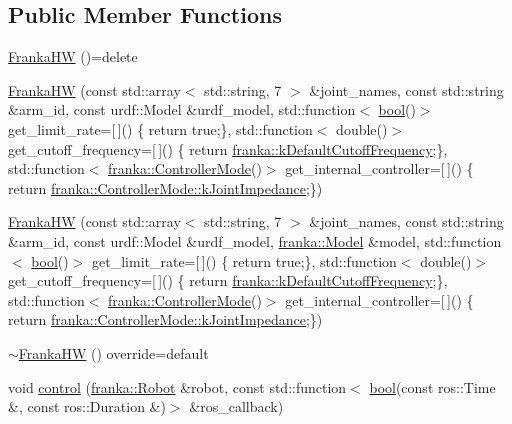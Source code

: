 \subsection*{Public Member Functions}
\begin{DoxyCompactItemize}
\item 
\hyperlink{classfranka__hw_1_1FrankaHW_a07f709fd8367ebf376214e4decf8cf57}{Franka\+HW} ()=delete
\item 
\hyperlink{classfranka__hw_1_1FrankaHW_aa8af6654cc9b7562545a59c035e245b9}{Franka\+HW} (const std\+::array$<$ std\+::string, 7 $>$ \&joint\+\_\+names, const std\+::string \&arm\+\_\+id, const urdf\+::\+Model \&urdf\+\_\+model, std\+::function$<$ \hyperlink{classbool}{bool}()$>$ get\+\_\+limit\+\_\+rate=\mbox{[}$\,$\mbox{]}() \{ return true;\}, std\+::function$<$ double()$>$ get\+\_\+cutoff\+\_\+frequency=\mbox{[}$\,$\mbox{]}() \{ return \hyperlink{namespacefranka_ad8e3b7da346e03181ab5ac138a4171d4}{franka\+::k\+Default\+Cutoff\+Frequency};\}, std\+::function$<$ \hyperlink{namespacefranka_a3e20bc77587e2c0c53598753e3f4816b}{franka\+::\+Controller\+Mode}()$>$ get\+\_\+internal\+\_\+controller=\mbox{[}$\,$\mbox{]}() \{ return \hyperlink{namespacefranka_a3e20bc77587e2c0c53598753e3f4816baa7cd8fc7552b5b9c50684e57f032d724}{franka\+::\+Controller\+Mode\+::k\+Joint\+Impedance};\})
\item 
\hyperlink{classfranka__hw_1_1FrankaHW_a09c1a04fa14f9b7800d18d20afd58c78}{Franka\+HW} (const std\+::array$<$ std\+::string, 7 $>$ \&joint\+\_\+names, const std\+::string \&arm\+\_\+id, const urdf\+::\+Model \&urdf\+\_\+model, \hyperlink{classfranka_1_1Model}{franka\+::\+Model} \&model, std\+::function$<$ \hyperlink{classbool}{bool}()$>$ get\+\_\+limit\+\_\+rate=\mbox{[}$\,$\mbox{]}() \{ return true;\}, std\+::function$<$ double()$>$ get\+\_\+cutoff\+\_\+frequency=\mbox{[}$\,$\mbox{]}() \{ return \hyperlink{namespacefranka_ad8e3b7da346e03181ab5ac138a4171d4}{franka\+::k\+Default\+Cutoff\+Frequency};\}, std\+::function$<$ \hyperlink{namespacefranka_a3e20bc77587e2c0c53598753e3f4816b}{franka\+::\+Controller\+Mode}()$>$ get\+\_\+internal\+\_\+controller=\mbox{[}$\,$\mbox{]}() \{ return \hyperlink{namespacefranka_a3e20bc77587e2c0c53598753e3f4816baa7cd8fc7552b5b9c50684e57f032d724}{franka\+::\+Controller\+Mode\+::k\+Joint\+Impedance};\})
\item 
\hyperlink{classfranka__hw_1_1FrankaHW_ac8f6752340bb6ccb97a3b0f29d664516}{$\sim$\+Franka\+HW} () override=default
\item 
void \hyperlink{classfranka__hw_1_1FrankaHW_a7b2809eac4702b7a2284e5ea51628139}{control} (\hyperlink{classfranka_1_1Robot}{franka\+::\+Robot} \&robot, const std\+::function$<$ \hyperlink{classbool}{bool}(const ros\+::\+Time \&, const ros\+::\+Duration \&)$>$ \&ros\+\_\+callback)

\end{DoxyCompactItemize}
